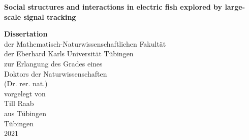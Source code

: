 \documentclass[11pt,pdftex,]{book}
\begin{document}


\begin{titlepage}
\begin{center}

\vspace*{.06\textheight}

{\huge \bfseries Social structures and interactions in electric fish explored by large-scale signal tracking
\par}\vspace{0.4cm} 



\vfill
\vspace{3cm}
{\Large \textbf{Dissertation}\\
der Mathematisch-Naturwissenschaftlichen Fakultät\\
der Eberhard Karls Universität Tübingen\\
zur Erlangung des Grades eines\\
Doktors der Naturwissenschaften\\
(Dr. rer. nat.)\\}
\vspace{3.5cm}
{\Large vorgelegt von\\Till Raab\\aus Tübingen\\}
\vspace{4cm}
{\Large Tübingen\\\vspace{0.1cm}
2021}\\[4cm] %
 
\vfill
\end{center}
\end{titlepage}
\end{document}

